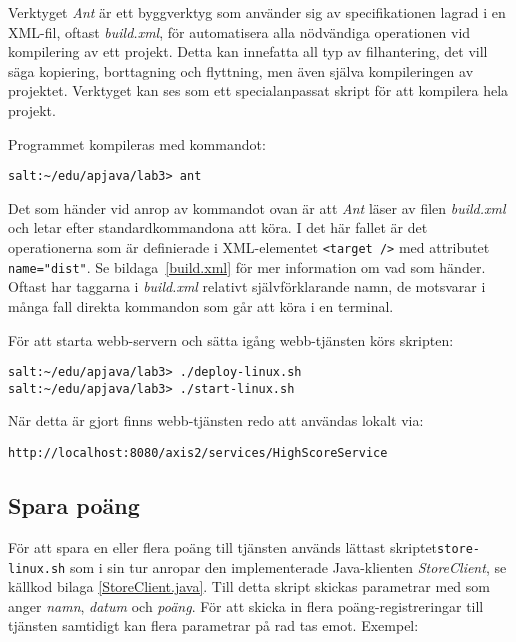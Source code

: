\documentclass[a4paper, 12pt]{article}
\begin{document}
Verktyget \textit{Ant} är ett byggverktyg som använder sig av
specifikationen lagrad i en XML-fil, oftast \textit{build.xml}, för
automatisera alla nödvändiga operationen vid kompilering av ett
projekt. Detta kan innefatta all typ av filhantering, det vill säga
kopiering, borttagning och flyttning, men även själva kompileringen av
projektet. Verktyget kan ses som ett specialanpassat skript för att
kompilera hela projekt.

Programmet kompileras med kommandot:\\
\begin{footnotesize}
\verb!salt:~/edu/apjava/lab3> ant!
\end{footnotesize}

Det som händer vid anrop av kommandot ovan är att \textit{Ant} läser
av filen \textit{build.xml} och letar efter standardkommandona att
köra. I det här fallet är det operationerna som är definierade i
XML-elementet \verb!<target />! med attributet \verb!name="dist"!. Se
bildaga~\ref{build.xml} för mer information om vad som händer. Oftast
har taggarna i \textit{build.xml} relativt självförklarande namn, de
motsvarar i många fall direkta kommandon som går att köra i en
terminal.

För att starta webb-servern och sätta igång webb-tjänsten körs skripten:\\
\begin{footnotesize}
\verb!salt:~/edu/apjava/lab3> ./deploy-linux.sh !\\
\verb!salt:~/edu/apjava/lab3> ./start-linux.sh !
\end{footnotesize}

När detta är gjort finns webb-tjänsten redo att användas lokalt via:\\
\begin{footnotesize}
\verb!http://localhost:8080/axis2/services/HighScoreService!
\end{footnotesize}

\subsection{Spara poäng}

För att spara en eller flera poäng till tjänsten används lättast
skriptet\linebreak \texttt{store-linux.sh} som i sin tur anropar den
implementerade Java-klienten \textit{StoreClient}, se källkod bilaga
\ref{StoreClient.java}. Till detta skript skickas parametrar med som
anger \textit{namn}, \textit{datum} och \textit{poäng}. För att skicka
in flera poäng-registreringar till tjänsten samtidigt kan flera
parametrar på rad tas emot. Exempel:
\end{document}
